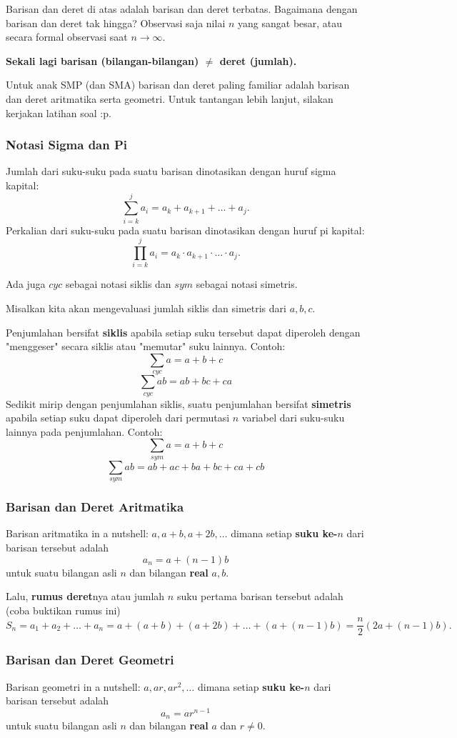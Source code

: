 Barisan dan deret di atas adalah barisan dan deret terbatas. Bagaimana dengan barisan dan deret tak hingga? Observasi saja nilai $n$ yang sangat besar, atau secara formal observasi saat $n \rightarrow \infty.$

\textbf{Sekali lagi barisan (bilangan-bilangan) $\neq$ deret (jumlah).}

Untuk anak SMP (dan SMA) barisan dan deret paling familiar adalah barisan dan deret aritmatika serta geometri. Untuk tantangan lebih lanjut, silakan kerjakan latihan soal :p.

\subsubsection{Notasi Sigma dan Pi}
Jumlah dari suku-suku pada suatu barisan dinotasikan dengan huruf sigma kapital:
$$\sum_{i=k}^{j} a_i = a_k+a_{k+1}+\dots+a_j.$$
Perkalian dari suku-suku pada suatu barisan dinotasikan dengan huruf pi kapital:
$$\prod_{i=k}^{j} a_i = a_k \cdot a_{k+1}\cdot \ldots \cdot a_j.$$

Ada juga $cyc$ sebagai notasi siklis dan $sym$ sebagai notasi simetris.

Misalkan kita akan mengevaluasi jumlah siklis dan simetris dari $a,b,c$.

Penjumlahan bersifat \textbf{siklis} apabila setiap suku tersebut dapat diperoleh dengan "menggeser" secara siklis atau "memutar" suku lainnya.
Contoh: $$\sum_{cyc} a = a+b+c$$
     $$\sum_{cyc} ab = ab+ bc + ca$$
Sedikit mirip dengan penjumlahan siklis, suatu penjumlahan bersifat \textbf{simetris} apabila setiap suku dapat diperoleh dari permutasi $n$ variabel dari suku-suku lainnya pada penjumlahan. Contoh: 
    $$\sum_{sym} a = a+b+c$$
    $$\sum_{sym} ab = ab+ ac + ba + bc + ca + cb$$
\subsubsection{Barisan dan Deret Aritmatika}
Barisan aritmatika in a nutshell: $a,a+b,a+2b,\dots$ dimana setiap \textbf{suku ke-$n$} dari barisan tersebut adalah $$a_n=a+(n-1)b$$ untuk suatu bilangan asli $n$ dan bilangan \textbf{real} $a,b$.

Lalu, \textbf{rumus deret}nya atau jumlah $n$ suku pertama barisan tersebut adalah (coba buktikan rumus ini) $$S_n = a_1+a_2+\dots+a_n=a+(a+b)+(a+2b)+\dots+(a+(n-1)b)=\dfrac{n}{2}(2a+(n-1)b).$$
\subsubsection{Barisan dan Deret Geometri}
 Barisan geometri in a nutshell: $a,ar,ar^2,\dots$ dimana setiap \textbf{suku ke-$n$} dari barisan tersebut adalah $$a_n=ar^{n-1}$$ untuk suatu bilangan asli $n$ dan bilangan \textbf{real} $a$ dan $r \neq 0$.

